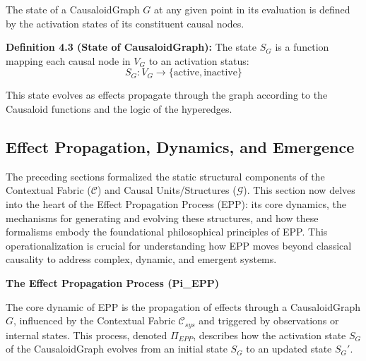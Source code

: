         
\begin{definition}
\label{def:causaloid_graph_state}        
        The state of a CausaloidGraph \( G \) at any given point in its evaluation is defined by the activation states of its constituent causal nodes. 
        
        \textbf{Definition 4.3 (State of CausaloidGraph):} The state \( S_G \) is a function mapping each causal node in \(V_G\) to an activation status:
        \[ S_G: V_G \to \{\text{active}, \text{inactive}\} \]
\end{definition}

This state evolves as effects propagate through the graph according to the Causaloid functions and the logic of the hyperedges.

\newpage


\subsection{Effect Propagation, Dynamics, and Emergence}
\label{sec:formalization_epp}

The preceding sections formalized the static structural components of the Contextual Fabric (\(\mathcal{C}\)) and Causal Units/Structures (\(\mathcal{G}\)). This section now delves into the heart of the Effect Propagation Process (EPP): its core dynamics, the mechanisms for generating and evolving these structures, and how these formalisms embody the foundational philosophical principles of EPP. This operationalization is crucial for understanding how EPP moves beyond classical causality to address complex, dynamic, and emergent systems.

\textbf{The Effect Propagation Process (Pi\_EPP)}


The core dynamic of EPP is the propagation of effects through a CausaloidGraph \(G\), influenced by the Contextual Fabric \(\mathcal{C}_{sys}\) and triggered by observations or internal states. This process, denoted \(\Pi_{EPP}\), describes how the activation state \(S_G\) of the CausaloidGraph evolves from an initial state \(S_G\) to an updated state \(S_G'\).


